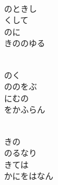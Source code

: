 \documentclass[10pt,b5j]{tarticle} %
\begin{document}
\begin{enumerate}
\begin{minipage}[c]{\blocksize}
    \end{minipage}
    \begin{minipage}[c]{\blocksize}
        
        \vspace{\linespace}
        \item~\\
        のときし\\
        くして\\
        のに\\
        きののゆる
        
    \end{minipage}
    \begin{minipage}[c]{\blocksize}
        
        \vspace{\linespace}
        \item~\\
        のく\\
        ののをぶ\\
        にむの\\
        をかふらん
        
    \end{minipage}
    \begin{minipage}[c]{\blocksize}
        
        \vspace{\linespace}
        \item~\\
        きの\\
        のるなり\\
        きては\\
        かにをはなん
    
    \end{minipage}
\end{enumerate} %
\end{document}
